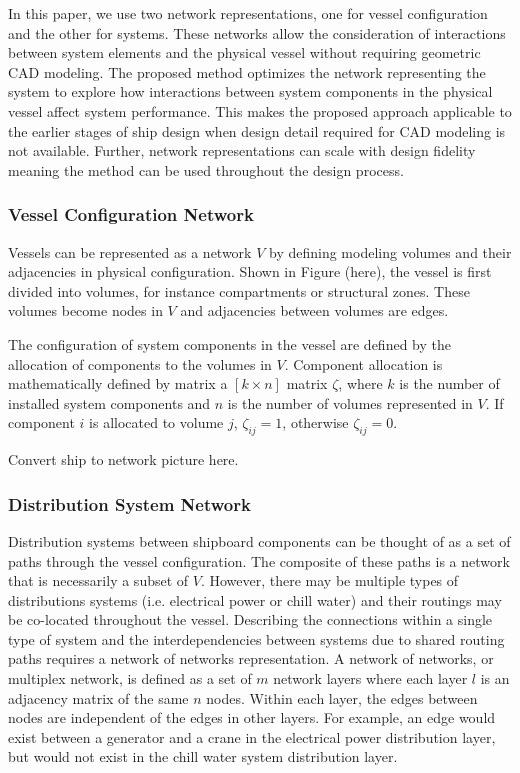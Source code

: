 \documentclass[preprint,12pt]{elsarticle}
\begin{document}
In this paper, we use two network representations, one for vessel configuration and the other for systems. These networks allow the consideration of interactions between system elements and the physical vessel without requiring geometric CAD modeling. The proposed method optimizes the network representing the system to explore how interactions between system components in the physical vessel affect system performance. This makes the proposed approach applicable to the earlier stages of ship design when design detail required for CAD modeling is not available. Further, network representations can scale with design fidelity \cite{Rigterink2014, Gillespie2012} meaning the method can be used throughout the design process.

\subsubsection{Vessel Configuration Network} \label{sec:vesselmodel}
Vessels can be represented as a network $V$ by defining modeling volumes and their adjacencies in physical configuration. Shown in Figure (here), the vessel is first divided into volumes, for instance compartments or structural zones. These volumes become nodes in $V$ and adjacencies between volumes are edges. 

The configuration of system components in the vessel are defined by the allocation of components to the volumes in $V$. Component allocation is mathematically defined by matrix a $[k \times n]$ matrix $\zeta$, where $k$ is the number of installed system components and $n$ is the number of volumes represented in $V$. If component $i$ is allocated to volume $j$, $\zeta_{ij}=1$, otherwise $\zeta_{ij}=0$.   

Convert ship to network picture here.

 

\subsubsection{Distribution System Network} \label{sec:sysmodel}
Distribution systems between shipboard components can be thought of as a set of paths through the vessel configuration. The composite of these paths is a network that is necessarily a subset of $V$. However, there may be multiple types of distributions systems (i.e. electrical power or chill water) and their routings may be co-located throughout the vessel. Describing the connections within a single type of system and the interdependencies between systems due to shared routing paths requires a network of networks representation. A network of networks, or multiplex network, is defined as a set of $m$ network layers where each layer $l$ is an adjacency matrix of the same $n$ nodes. Within each layer, the edges between nodes are independent of the edges in other layers. For example, an edge would exist between a generator and a crane in the electrical power distribution layer, but would not exist in the chill water system distribution layer. 
\end{document}
